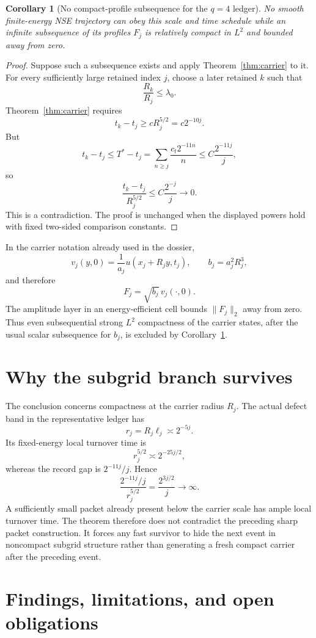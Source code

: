 \documentclass[11pt]{article}
\newtheorem{corollary}[theorem]{Corollary}
\theoremstyle{remark}
\begin{document}
\begin{corollary}[No compact-profile subsequence for the \(q=4\) ledger]
\label{cor:q4}
No smooth finite-energy NSE trajectory can obey this scale and time schedule
while an infinite subsequence of its profiles \(F_j\) is relatively compact
in \(L^2\) and bounded away from zero.
\end{corollary}

\begin{proof}
Suppose such a subsequence exists and apply Theorem~\ref{thm:carrier} to it.
For every sufficiently large retained index \(j\), choose a later retained
\(k\) such that
\[
 \frac{R_k}{R_j}\le\lambda_0.
\]
Theorem~\ref{thm:carrier} requires
\[
 t_k-t_j\ge cR_j^{5/2}=c2^{-10j}.
\]
But
\[
 t_k-t_j
 \le
 T^*-t_j
 =
 \sum_{n\ge j}\frac{c_t2^{-11n}}n
 \le
 C\frac{2^{-11j}}j,
\]
so
\[
 \frac{t_k-t_j}{R_j^{5/2}}
 \le
 C\frac{2^{-j}}j
 \longrightarrow0.
\]
This is a contradiction.  The proof is unchanged when the displayed powers
hold with fixed two-sided comparison constants.
\end{proof}

In the carrier notation already used in the dossier,
\[
 v_j(y,0)
 =
 \frac1{a_j}u(x_j+R_jy,t_j),
 \qquad
 b_j=a_j^2R_j^3,
\]
and therefore
\[
 F_j=\sqrt{b_j}\,v_j(\cdot,0).
\]
The amplitude layer in an energy-efficient cell bounds \(\|F_j\|_2\) away
from zero.  Thus even subsequential strong \(L^2\) compactness of the carrier
states, after the usual scalar subsequence for \(b_j\), is excluded by
Corollary~\ref{cor:q4}.

\section{Why the subgrid branch survives}

The conclusion concerns compactness at the carrier radius \(R_j\).  The
actual defect band in the representative ledger has
\[
 r_j=R_j\ell_j\asymp2^{-5j}.
\]
Its fixed-energy local turnover time is
\[
 r_j^{5/2}\asymp2^{-25j/2},
\]
whereas the record gap is \(2^{-11j}/j\).  Hence
\[
 \frac{2^{-11j}/j}{r_j^{5/2}}
 =
 \frac{2^{3j/2}}j
 \longrightarrow\infty.
\]
A sufficiently small packet already present below the carrier scale has
ample local turnover time.  The theorem therefore does not contradict the
preceding sharp packet construction.  It forces any fast survivor to hide
the next event in noncompact subgrid structure rather than generating a
fresh compact carrier after the preceding event.

\section{Findings, limitations, and open obligations}
\end{document}
